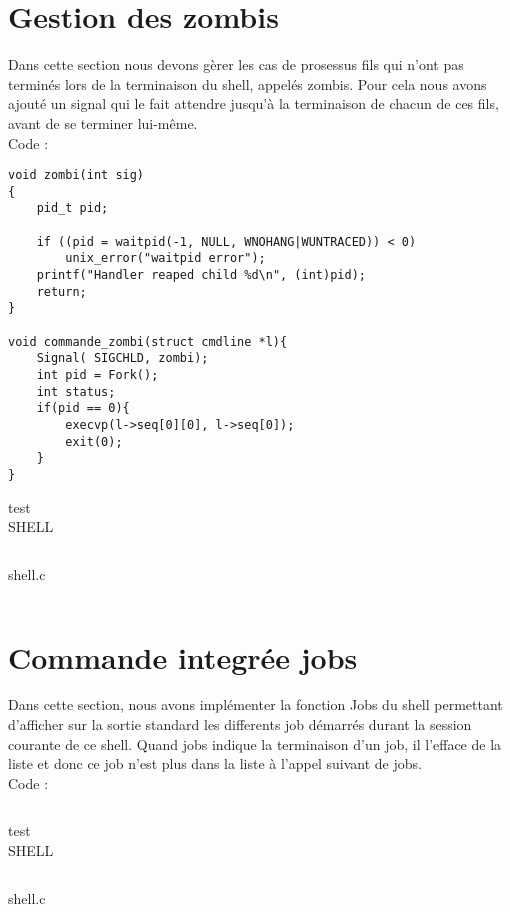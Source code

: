 \documentclass{report}
\begin{document}
		\section{Gestion des zombis}
	Dans cette section nous devons g\`erer les cas de prosessus fils qui n'ont pas termin\'es lors de la terminaison du shell, appel\'es zombis. Pour cela nous avons ajout\'e un signal qui le fait attendre jusqu'\`a la terminaison de chacun de ces fils, avant de se terminer lui-m\^eme.\\Code :\\
			\begin{lstlisting}
void zombi(int sig)
{
    pid_t pid;

    if ((pid = waitpid(-1, NULL, WNOHANG|WUNTRACED)) < 0)
        unix_error("waitpid error");
    printf("Handler reaped child %d\n", (int)pid);
    return;
}

void commande_zombi(struct cmdline *l){
	Signal( SIGCHLD, zombi);
	int pid = Fork();
	int status;
	if(pid == 0){
		execvp(l->seq[0][0], l->seq[0]);
		exit(0);
	}
}
			\end{lstlisting}
			test \\ SHELL 
			\begin{lstlisting}[frame=single,basicstyle=\footnotesize,language=bash]
			\end{lstlisting}
			shell.c 
			\begin{lstlisting}[frame=single,basicstyle=\footnotesize,language=bash]
			\end{lstlisting}
		\section{Commande integr\'ee jobs}
			Dans cette section, nous avons impl\'ementer la fonction Jobs du shell permettant d'afficher sur la sortie standard les differents job d\'emarr\'es durant la session courante de ce shell. Quand jobs indique la terminaison d'un job, il l'efface de la liste et donc ce job n'est plus dans la liste \`a l'appel suivant de jobs.\\Code :
			\begin{lstlisting}
			\end{lstlisting}
			test \\ SHELL 
			\begin{lstlisting}[frame=single,basicstyle=\footnotesize,language=bash]
			\end{lstlisting}
			shell.c 
			\begin{lstlisting}[frame=single,basicstyle=\footnotesize,language=bash]
			\end{lstlisting}
\end{document}

